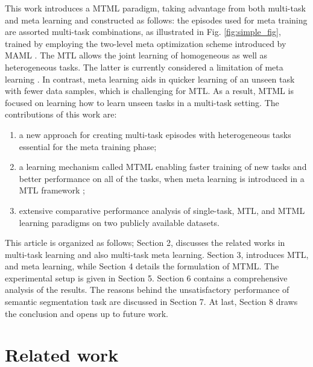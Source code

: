 \documentclass[conference]{IEEEtran}
\begin{document}
This work introduces a \ac{MTML} paradigm, taking advantage from both multi-task and meta learning and constructed as follows:
the episodes used for meta training are assorted multi-task combinations, as illustrated in Fig. \ref{fig:simple_fig}, trained by employing the two-level meta optimization scheme introduced by MAML \cite{pmlr-v70-finn17a}.
The \ac{MTL} allows the joint learning of homogeneous as well as heterogeneous tasks. The latter is currently considered a limitation of meta learning \cite{hospedales2020meta}. 
In contrast, meta learning aids in quicker learning of an unseen task with fewer data samples, which is challenging for \ac{MTL}. 
As a result, \ac{MTML} is focused on learning how to learn unseen tasks in a multi-task setting.
The contributions of this work are:
\begin{enumerate}

\setlength\itemsep{0em}
    \item a new approach for creating multi-task episodes with heterogeneous tasks essential for the meta training phase;
    \item a learning mechanism called \ac{MTML} enabling faster training of new tasks and better performance on all of the tasks, when meta learning is introduced in a \ac{MTL} framework ;
    \item extensive comparative performance analysis of single-task, \ac{MTL}, and \ac{MTML} learning paradigms on two publicly available datasets.
\end{enumerate}

This article is organized as follows; Section 2, discusses the related works in multi-task learning and also multi-task meta learning.  Section 3, introduces \ac{MTL}, and meta learning, while Section 4 details the formulation of \ac{MTML}. The experimental setup is given in Section 5. Section 6 contains a comprehensive analysis of the results. The reasons behind the unsatisfactory performance of semantic segmentation task are discussed in Section 7. At last, Section 8 draws the conclusion and opens up to future work.


\section{Related work}
\end{document}
